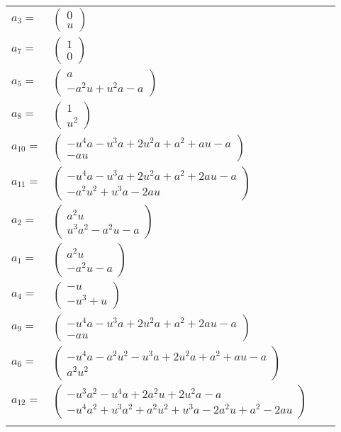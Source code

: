 \documentclass[1p]{elsarticle_modified}
\theoremstyle{definition}
\begin{document}
\begin{tabular}{m{7pt} m{180pt} m{7pt} m{180pt} }
\flushright $a_{3}=$&$\begin{pmatrix}0\\u\end{pmatrix}$ \\
\flushright $a_{7}=$&$\begin{pmatrix}1\\0\end{pmatrix}$ \\
\flushright $a_{5}=$&$\begin{pmatrix}a\\- a^2 u+u^2 a- a\end{pmatrix}$ \\
\flushright $a_{8}=$&$\begin{pmatrix}1\\u^2\end{pmatrix}$ \\
\flushright $a_{10}=$&$\begin{pmatrix}- u^4 a- u^3 a+2 u^2 a+a^2+a u- a\\- a u\end{pmatrix}$ \\
\flushright $a_{11}=$&$\begin{pmatrix}- u^4 a- u^3 a+2 u^2 a+a^2+2 a u- a\\- a^2 u^2+u^3 a-2 a u\end{pmatrix}$ \\
\flushright $a_{2}=$&$\begin{pmatrix}a^2 u\\u^3 a^2- a^2 u- a\end{pmatrix}$ \\
\flushright $a_{1}=$&$\begin{pmatrix}a^2 u\\- a^2 u- a\end{pmatrix}$ \\
\flushright $a_{4}=$&$\begin{pmatrix}- u\\- u^3+u\end{pmatrix}$ \\
\flushright $a_{9}=$&$\begin{pmatrix}- u^4 a- u^3 a+2 u^2 a+a^2+2 a u- a\\- a u\end{pmatrix}$ \\
\flushright $a_{6}=$&$\begin{pmatrix}- u^4 a- a^2 u^2- u^3 a+2 u^2 a+a^2+a u- a\\a^2 u^2\end{pmatrix}$ \\
\flushright $a_{12}=$&$\begin{pmatrix}- u^3 a^2- u^4 a+2 a^2 u+2 u^2 a- a\\- u^4 a^2+u^3 a^2+a^2 u^2+u^3 a-2 a^2 u+a^2-2 a u\end{pmatrix}$\\&\end{tabular}
\end{document}
